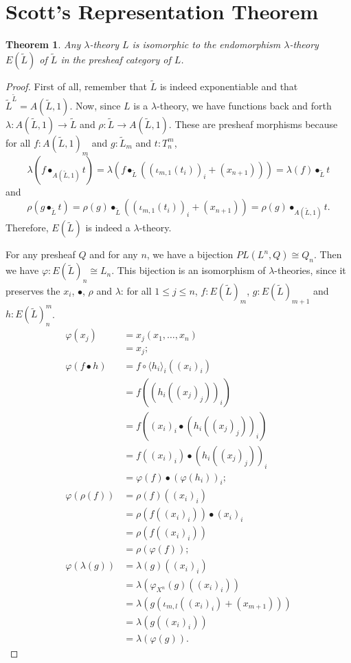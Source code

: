 \documentclass[a4paper]{amsbook}
\newtheorem{theorem}{Theorem}
\theoremstyle{definition}
\theoremstyle{remark}
\begin{document}
  \section{Scott's Representation Theorem}
  \begin{theorem}
    Any $ \lambda $-theory $ L $ is isomorphic to the endomorphism $ \lambda $-theory $ E(\tilde L) $ of $ \tilde L $ in the presheaf category of $ L $.
  \end{theorem}
  \begin{proof}
    First of all, remember that $ \tilde L $ is indeed exponentiable and that $ \tilde L^{\tilde L} = A(\tilde L, 1) $.
    Now, since $ L $ is a $ \lambda $-theory, we have functions back and forth $ \lambda: A(\tilde L, 1) \to \tilde L $ and $ \rho: \tilde L \to A(\tilde L, 1) $. These are presheaf morphisms because for all $ f: A(\tilde L, 1)_m $ and $ g: \tilde L_m $ and $ t: T_n^m $,
    \[ \lambda(f \bullet_{A(\tilde L, 1)} t) = \lambda(f \bullet_{\tilde L} ((\iota_{m, 1}(t_i))_i + (x_{n + 1}))) = \lambda(f) \bullet_{\tilde L} t \]
    and
    \[ \rho(g \bullet_{\tilde L} t) = \rho(g) \bullet_{\tilde L} ((\iota_{m, 1}(t_i))_i + (x_{n + 1})) = \rho(g) \bullet_{A(\tilde L, 1)} t. \]
    Therefore, $ E(\tilde L) $ is indeed a $ \lambda $-theory.

    For any presheaf $ Q $ and for any $ n $, we have a bijection $ PL(L^n, Q) \cong Q_n $.
    Then we have $ \varphi: E(\tilde L)_n \cong L_n $.
    This bijection is an isomorphism of $ \lambda $-theories, since it preserves the $ x_i $, $ \bullet $, $ \rho $ and $ \lambda $: for all $ 1 \leq j \leq n $, $ f: E(\tilde L)_m $, $ g: E(\tilde L)_{m + 1} $ and $ h: E(\tilde L)_n^m $.
    \begin{align*}
      \varphi(x_j) &= x_j(x_1, \dots, x_n)\\
      &= x_j;\\
      \varphi(f \bullet h) &= f \circ \langle h_i \rangle_i((x_i)_i)\\
      &= f((h_i((x_j)_j))_i)\\
      &= f((x_i)_i \bullet (h_i((x_j)_j))_i)\\
      &= f((x_i)_i) \bullet (h_i((x_j)_j))_i\\
      &= \varphi(f) \bullet (\varphi(h_i))_i;\\
      \varphi(\rho(f)) &= \rho(f)((x_i)_i)\\
      &= \rho(f((x_i)_i)) \bullet (x_i)_i\\
      &= \rho(f((x_i)_i))\\
      &= \rho(\varphi(f));\\
      \varphi(\lambda(g)) &= \lambda(g)((x_i)_i)\\
      &= \lambda(\varphi_{X^n}(g)((x_i)_i))\\
      &= \lambda(g(\iota_{m, l}((x_i)_i) + (x_{m + 1})))\\
      &= \lambda(g((x_i)_i))\\
      &= \lambda(\varphi(g)).
    \end{align*}
  \end{proof}
\end{document}
